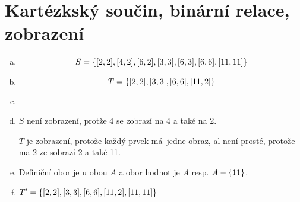 
\BeginDoc{}
\section{Kartézkský součin, binární relace, zobrazení}
\Pr
{}
\begin{enumerate}[a)]
	\item 
$$ S = \left\{{[2,2],[4,2],[6,2],[3,3],[6,3],[6,6],[11,11]}\right\}$$
\item
$$ T = \left\{{[2,2],[3,3],[6,6],[11,2]}\right\}$$
\item\
\item $S$ není zobrazení, protže 4 se zobrazí na 4 a také na 2.

	$T$ je zobrazení, protože každý prvek má jedne obraz, al není prosté, protože ma 2 ze sobrazí 2 a také 11.
\item 
	Definiční obor je u obou $A$ a obor hodnot je $A$ resp. $A-\left\{{11}\right\}$.
\item $T' = \left\{{[2,2],[3,3],[6,6],[11,2],[11,11]}\right\}$
\end{enumerate}




\EndDoc

